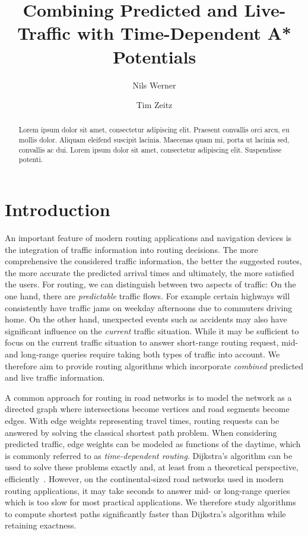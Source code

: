 \documentclass[a4paper,UKenglish,cleveref, autoref, thm-restate]{lipics-v2021}
\title{Combining Predicted and Live-Traffic with Time-Dependent A* Potentials} %
\author{Nils Werner}{Karlsruhe Institute of Technology, Germany}{}{}{}
\author{Tim Zeitz}{Karlsruhe Institute of Technology, Germany}{tim.zeitz@kit.edu}{https://orcid.org/0000-0003-4746-3582}{}
\begin{document}
\maketitle

\begin{abstract}
Lorem ipsum dolor sit amet, consectetur adipiscing elit. Praesent convallis orci arcu, eu mollis dolor. Aliquam eleifend suscipit lacinia. Maecenas quam mi, porta ut lacinia sed, convallis ac dui. Lorem ipsum dolor sit amet, consectetur adipiscing elit. Suspendisse potenti. 
\end{abstract}

\newpage

\section{Introduction}

An important feature of modern routing applications and navigation devices is the integration of traffic information into routing decisions.
The more comprehensive the considered traffic information, the better the suggested routes, the more accurate the predicted arrival times and ultimately, the more satisfied the users.
For routing, we can distinguish between two aspects of traffic:
On the one hand, there are \emph{predictable} traffic flows.
For example certain highways will consistently have traffic jams on weekday afternoons due to commuters driving home.
On the other hand, unexpected events such as accidents may also have significant influence on the \emph{current} traffic situation.
While it may be sufficient to focus on the current traffic situation to answer short-range routing request, mid- and long-range queries require taking both types of traffic into account.
We therefore aim to provide routing algorithms which incorporate \emph{combined} predicted and live traffic information.

A common approach for routing in road networks is to model the network as a directed graph where intersections become vertices and road segments become edges.
With edge weights representing travel times, routing requests can be answered by solving the classical shortest path problem.
When considering predicted traffic, edge weights can be modeled as functions of the daytime, which is commonly referred to as \emph{time-dependent routing}.
Dijkstra's algorithm can be used to solve these problems exactly and, at least from a theoretical perspective, efficiently~\cite{d-ntpcg-59}.
However, on the continental-sized road networks used in modern routing applications, it may take seconds to answer mid- or long-range queries which is too slow for most practical applications.
We therefore study algorithms to compute shortest paths significantly faster than Dijkstra's algorithm while retaining exactness.
\end{document}
